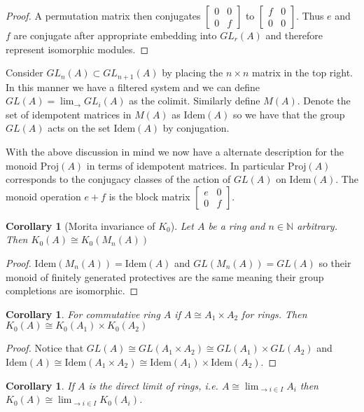\documentclass[12pt]{report}
\numberwithin{equation}{section}
\newcommand{\N}{\mathbb{N}}
\newcounter{dummy} \numberwithin{dummy}{section}
\newtheorem{corollary}[dummy]{Corollary}
\begin{document}
\begin{proof}
		A permutation matrix then conjugates $\begin{bmatrix} 0 & 0 \\ 0 & f \end{bmatrix}$ to $\begin{bmatrix} f & 0 \\ 0 & 0 \end{bmatrix}$. Thus $e$ and $f$ are conjugate after appropriate embedding into $GL_r(A)$ and therefore represent isomorphic modules.
	\end{proof}
	
	Consider $GL_n(A) \subset GL_{n+1}(A)$ by placing the $n\times n $ matrix in the top right. In this manner we have a filtered system and we can define $GL(A)= \lim_{\to} GL_i(A)$ as the colimit. Similarly define $M(A)$. Denote the set of idempotent matrices in $M(A)$ as $\mathrm{Idem}(A)$ so we have that the group $GL(A)$ acts on the set $\mathrm{Idem}(A)$ by conjugation.
	
	With the above discussion in mind we now have a alternate description for the monoid $\mathrm{Proj}(A)$ in terms of idempotent matrices. In particular $\mathrm{Proj}(A)$ corresponds to the conjugacy classes of the action of $GL(A)$ on $\mathrm{Idem}(A)$. The monoid operation $e +f$ is the block matrix $\begin{bmatrix}
		e & 0 \\ 0 & f
	\end{bmatrix}. $
	
	\begin{corollary}[Morita invariance of $K_0$]\label{morita}
		Let $A$ be a ring and $n \in \N $ arbitrary. Then $K_0(A) \cong K_0(M_n(A))$
	\end{corollary}
	\begin{proof}
		$\mathrm{Idem}(M_n(A)) = \mathrm{Idem}(A)$ and $GL(M_n(A)) = GL(A)$ so their monoid of finitely generated protectives are the same meaning their group completions are isomorphic.
	\end{proof}
	
	\begin{corollary}\label{propdirectproductofk0}
		For commutative ring $A$ if $A \cong A_1 \times A_2$ for rings. Then	$K_0(A) \cong K_0(A_1) \times K_0(A_2)$
	\end{corollary}
	\begin{proof}
	Notice that $GL(A) \cong GL(A_1 \times A_2) \cong GL(A_1) \times GL(A_2)$ and $\mathrm{Idem}(A) \cong \mathrm{Idem}(A_1 \times A_2) \cong \mathrm{Idem}(A_1) \times \mathrm{Idem}(A_2)$.
	\end{proof}
	\begin{corollary}\label{directsystem}
		If $A$ is the direct limit of rings, i.e. $A\cong \lim_{\to i \in I} A_i $ then $K_0(A) \cong \lim_{\to i \in I} K_0(A_i)$.
	\end{corollary}
	
\end{document}
